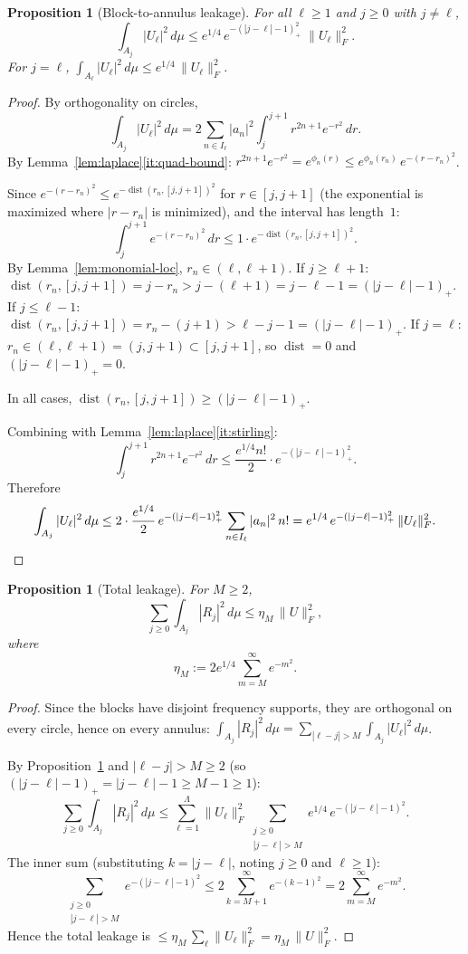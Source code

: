 \documentclass[11pt]{article}
\newtheorem{proposition}[theorem]{Proposition}
\newcommand{\norm}[1]{\lVert #1\rVert}
\DeclareMathOperator{\dist}{dist}
\begin{document}
\begin{proposition}[Block-to-annulus leakage]\label{prop:leak-single}
For all $\ell \ge 1$ and $j \ge 0$ with $j \ne \ell$,
\[
  \int_{A_j}|U_\ell|^2\,d\mu
  \le e^{1/4}\,e^{-(|j-\ell|-1)_+^2}\;\norm{U_\ell}_F^2.
\]
For $j = \ell$,
$\int_{A_\ell}|U_\ell|^2\,d\mu \le e^{1/4}\,\norm{U_\ell}_F^2$.
\end{proposition}
\begin{proof}
By orthogonality on circles,
\[
  \int_{A_j}|U_\ell|^2\,d\mu
  = 2\sum_{n\in I_\ell}|a_n|^2\int_j^{j+1}r^{2n+1}e^{-r^2}\,dr.
\]
By Lemma~\ref{lem:laplace}\ref{it:quad-bound}:
$r^{2n+1}e^{-r^2} = e^{\phi_n(r)} \le e^{\phi_n(r_n)}\,e^{-(r-r_n)^2}$.

Since $e^{-(r-r_n)^2} \le e^{-\dist(r_n,[j,j+1])^2}$ for $r \in [j,j+1]$
(the exponential is maximized where $|r-r_n|$ is minimized), and the interval has length~$1$:
\[
  \int_j^{j+1}e^{-(r-r_n)^2}\,dr \le 1\cdot e^{-\dist(r_n,[j,j+1])^2}.
\]
By Lemma~\ref{lem:monomial-loc}, $r_n \in (\ell, \ell+1)$.
If $j \ge \ell+1$: $\dist(r_n,[j,j+1]) = j - r_n > j - (\ell+1) = j - \ell - 1 = (|j-\ell|-1)_+$.
If $j \le \ell-1$: $\dist(r_n,[j,j+1]) = r_n - (j+1) > \ell - j - 1 = (|j-\ell|-1)_+$.
If $j = \ell$: $r_n \in (\ell,\ell+1) = (j,j+1) \subset [j,j+1]$, so $\dist = 0$ and $(|j-\ell|-1)_+ = 0$.

In all cases, $\dist(r_n,[j,j+1]) \ge (|j-\ell|-1)_+$.

Combining with Lemma~\ref{lem:laplace}\ref{it:stirling}:
\[
  \int_j^{j+1}r^{2n+1}e^{-r^2}\,dr
  \le \frac{e^{1/4}n!}{2}\cdot e^{-(|j-\ell|-1)_+^2}.
\]
Therefore
\[
  \int_{A_j}|U_\ell|^2\,d\mu
  \le 2\cdot\frac{e^{1/4}}{2}\,e^{-(|j-\ell|-1)_+^2}\sum_{n\in I_\ell}|a_n|^2\,n!
  = e^{1/4}\,e^{-(|j-\ell|-1)_+^2}\,\norm{U_\ell}_F^2. \qedhere
\]
\end{proof}

\begin{proposition}[Total leakage]\label{prop:total-leak}
For $M \ge 2$,
\[
  \sum_{j\ge 0}\int_{A_j}|R_j|^2\,d\mu \le \eta_M\,\norm{U}_F^2,
\]
where
\begin{equation}\label{eq:etaM-def}
  \eta_M := 2e^{1/4}\sum_{m=M}^{\infty}e^{-m^2}.
\end{equation}
\end{proposition}
\begin{proof}
Since the blocks have disjoint frequency supports, they are orthogonal on every circle,
hence on every annulus:
$\int_{A_j}|R_j|^2\,d\mu = \sum_{|\ell-j|>M}\int_{A_j}|U_\ell|^2\,d\mu$.

By Proposition~\ref{prop:leak-single} and $|\ell - j| > M \ge 2$
(so $(|j-\ell|-1)_+ = |j-\ell|-1 \ge M - 1 \ge 1$):
\[
  \sum_{j\ge 0}\int_{A_j}|R_j|^2\,d\mu
  \le \sum_{\ell=1}^{\Lambda}\norm{U_\ell}_F^2
    \sum_{\substack{j\ge 0\\|j-\ell|>M}}e^{1/4}\,e^{-(|j-\ell|-1)^2}.
\]
The inner sum (substituting $k = |j-\ell|$, noting $j \ge 0$ and $\ell \ge 1$):
\[
  \sum_{\substack{j\ge 0\\|j-\ell|>M}}e^{-(|j-\ell|-1)^2}
  \le 2\sum_{k=M+1}^{\infty}e^{-(k-1)^2}
  = 2\sum_{m=M}^{\infty}e^{-m^2}.
\]
Hence the total leakage is $\le \eta_M\,\sum_\ell\norm{U_\ell}_F^2 = \eta_M\,\norm{U}_F^2$.
\end{proof}
\end{document}
